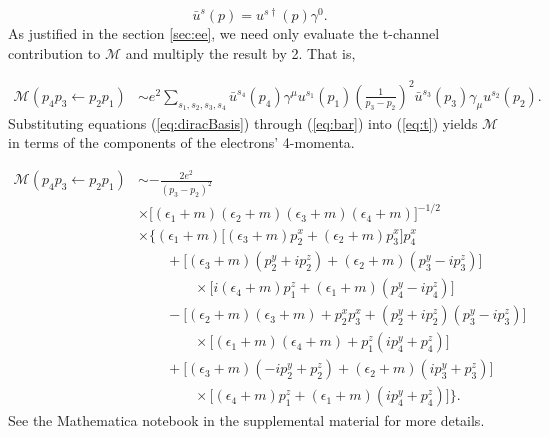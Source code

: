 \documentclass{article}
\begin{document}
\begin{equation}
  \bar{u}^s(p) = u^{s\dag}(p)\gamma^0.
  \label{eq:bar}
\end{equation}
%
As justified in the section \ref{sec:ee}, we need only evaluate the t-channel
contribution to $\mathcal{M}$ and multiply the result by 2.  That is, 

\begin{equation} 
  \label{eq:t} 
  \begin{aligned} 
    \mathcal{M}(p_4p_3\leftarrow
    p_2p_1) 
    &\sim
    e^2 \sum_{s_1,s_2,s_3, s_4}
      \bar{u}^{s_4}\left(p_4\right)\gamma^{\mu}u^{s_1}\left(p_1\right)
      \left(\frac{1}{p_3 - p_2}\right)^2
      \bar{u}^{s_3}\left(p_3\right)\gamma_{\mu}u^{s_2}\left(p_2\right).
  \end{aligned} 
\end{equation}
%
Substituting equations (\ref{eq:diracBasis}) through (\ref{eq:bar}) into
(\ref{eq:t}) yields $\mathcal{M}$ in terms of the components of the electrons'
4-momenta.

\begin{equation}
\begin{aligned}
\mathcal{M}(p_4p_3\leftarrow p_2p_1)
&\sim
-\frac{2e^2}{(p_3 - p_2)^2}
\\&\times
\big[(\epsilon_1 + m)(\epsilon_2 + m)(\epsilon_3 + m)(\epsilon_4 + m)\big]^{-1/2}
\\&\times\Big\{
    (\epsilon_1 + m)\big[(\epsilon_3 + m)p^x_2 + (\epsilon_2 + m) p^x_3\big]p^x_4
    \\&\qquad+
    \big[(\epsilon_3 + m)(p^y_2 + ip^z_2) + (\epsilon_2 + m)(p^y_3 - ip^z_3)\big]
        \\&\qquad\qquad\times
        \big[i(\epsilon_4 + m)p^z_1 + (\epsilon_1 + m)(p^y_4 - ip^z_4)\big]
    \\&\qquad-
    \big[(\epsilon_2 + m)(\epsilon_3 + m) + p^x_2p^x_3
        + (p^y_2 + ip^z_2)( p^y_3 - ip^z_3)\big]
        \\&\qquad\qquad\times
        \big[(\epsilon_1 + m) (\epsilon_4 + m) + p^z_1(ip^y_4 + p^z_4)\big] 
    \\&\qquad+
    \big[(\epsilon_3 + m)(-ip^y_2 + p^z_2) + (\epsilon_2 + m)(ip^y_3 + p^z_3)\big]
        \\&\qquad\qquad\times
    \big[(\epsilon_4 + m)p^z_1 + (\epsilon_1 + m)(ip^y_4 + p^z_4)\big]
\Big\}.
\end{aligned}
\end{equation}
%
See the Mathematica \cite{Mathematica} notebook in the supplemental material
for more details.
\end{document}
